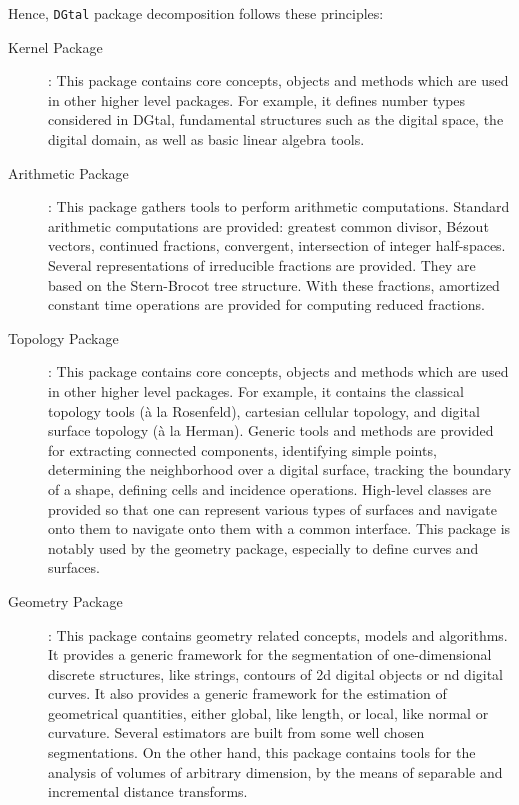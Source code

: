 \documentclass[11pt, a4paper]{article}
\def\DGtal{\texttt{DGtal} }
\begin{document}
Hence, \DGtal package decomposition follows these principles:
\begin{description}
  \item[Kernel Package]: This package contains core concepts, objects
    and methods which are used in other higher level packages. For
    example, it defines number types considered in DGtal, fundamental
    structures such as the digital space, the digital domain, as well
    as basic linear algebra tools.

  \item[Arithmetic Package]: This package gathers tools to perform
    arithmetic computations. Standard arithmetic computations are
    provided: greatest common divisor, Bézout vectors, continued
    fractions, convergent, intersection of integer
    half-spaces. Several representations of irreducible fractions are
    provided. They are based on the Stern-Brocot tree structure. With
    these fractions, amortized constant time operations are provided
    for computing reduced fractions. 



  \item[Topology Package]: This package contains core concepts,
    objects and methods which are used in other higher level packages.
    For example, it contains the classical topology tools (à la
    Rosenfeld), cartesian cellular topology, and digital surface
    topology (à la Herman). Generic tools and methods are provided for
    extracting connected components, identifying simple points,
    determining the neighborhood over a digital surface, tracking the
    boundary of a shape, defining cells and incidence
    operations. High-level classes are provided so that one can
    represent various types of surfaces and navigate onto them to
    navigate onto them with a common interface.  This package is
    notably used by the geometry package, especially to define curves
    and surfaces.

  \item[Geometry Package]: This package contains geometry related
    concepts, models and algorithms. It provides a generic framework
    for the segmentation of one-dimensional discrete structures, like
    strings, contours of 2d digital objects or nd digital curves. It
    also provides a generic framework for the estimation of
    geometrical quantities, either global, like length, or local, like
    normal or curvature. Several estimators are built from some well
    chosen segmentations. On the other hand, this package contains
    tools for the analysis of volumes of arbitrary dimension, by the
    means of separable and incremental distance transforms.



\end{description}
\end{document}
